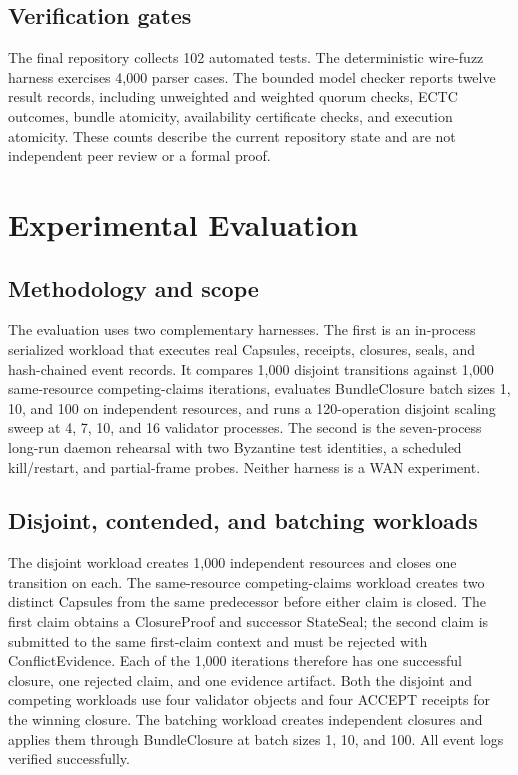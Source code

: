 \documentclass{ledger}
\begin{document}
\subsection{Verification gates}
The final repository collects 102 automated tests. The deterministic wire-fuzz harness exercises 4,000 parser cases. The bounded model checker reports twelve result records, including unweighted and weighted quorum checks, ECTC outcomes, bundle atomicity, availability certificate checks, and execution atomicity. These counts describe the current repository state and are not independent peer review or a formal proof.

\section{Experimental Evaluation}
\subsection{Methodology and scope}
The evaluation uses two complementary harnesses. The first is an in-process serialized workload that executes real Capsules, receipts, closures, seals, and hash-chained event records. It compares 1,000 disjoint transitions against 1,000 same-resource competing-claims iterations, evaluates BundleClosure batch sizes 1, 10, and 100 on independent resources, and runs a 120-operation disjoint scaling sweep at 4, 7, 10, and 16 validator processes. The second is the seven-process long-run daemon rehearsal with two Byzantine test identities, a scheduled kill/restart, and partial-frame probes. Neither harness is a WAN experiment.

\subsection{Disjoint, contended, and batching workloads}
The disjoint workload creates 1,000 independent resources and closes one transition on each. The same-resource competing-claims workload creates two distinct Capsules from the same predecessor before either claim is closed. The first claim obtains a ClosureProof and successor StateSeal; the second claim is submitted to the same first-claim context and must be rejected with ConflictEvidence. Each of the 1,000 iterations therefore has one successful closure, one rejected claim, and one evidence artifact. Both the disjoint and competing workloads use four validator objects and four ACCEPT receipts for the winning closure. The batching workload creates independent closures and applies them through BundleClosure at batch sizes 1, 10, and 100. All event logs verified successfully.
\end{document}
